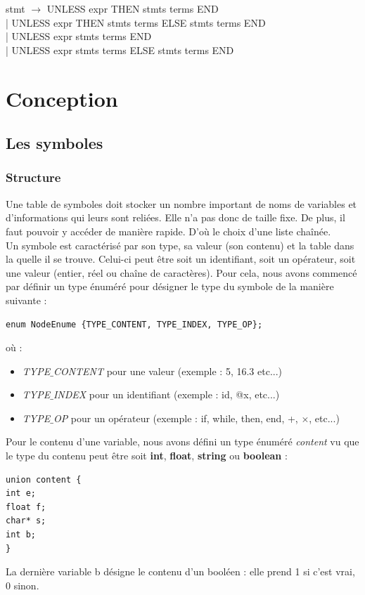\documentclass{article}
\begin{document}
\noindent stmt $\rightarrow$ UNLESS expr THEN stmts terms END \\ 
| UNLESS expr THEN stmts terms ELSE stmts terms END \\
| UNLESS expr stmts terms END \\
| UNLESS expr stmts terms ELSE stmts terms END \\ 

\section{Conception}

\subsection{Les symboles} 


\subsubsection*{Structure}
Une table de symboles doit stocker un nombre important de noms de variables et d'informations qui leurs sont reliées. Elle n'a pas donc de taille fixe. De plus, il faut pouvoir y accéder de manière rapide. D'où le choix d'une liste chaînée.\\
 
Un symbole est caractérisé par son type, sa valeur (son contenu) et la table dans la quelle il se trouve. Celui-ci peut être soit un identifiant, soit un opérateur, soit une valeur (entier, réel ou chaîne de caractères). Pour cela, nous avons commencé par définir un type énuméré pour désigner le type du symbole de la manière suivante : 
\begin{verbatim} 
enum NodeEnume {TYPE_CONTENT, TYPE_INDEX, TYPE_OP}; 
\end{verbatim}
où : 
\begin{itemize}
\item \emph{TYPE$\_$CONTENT} pour une valeur (exemple : 5, 16.3 etc...) \\
\item \emph{TYPE$\_$INDEX} pour un identifiant (exemple : id, @x, etc...) \\
\item \emph{TYPE$\_$OP} pour un opérateur (exemple : if, while, then, end, +, $\times$, etc...) \\
\end{itemize}

Pour le contenu d'une variable, nous avons défini un type énuméré \emph{content} vu que le type du contenu peut être soit \textbf{int}, \textbf{float}, \textbf{string} ou \textbf{boolean} :
\begin{verbatim}
union content {
int e;
float f;
char* s;
int b;
}
\end{verbatim}
La dernière variable b désigne le contenu d'un booléen : elle prend 1 si c'est vrai, 0 sinon. \\
\end{document}
